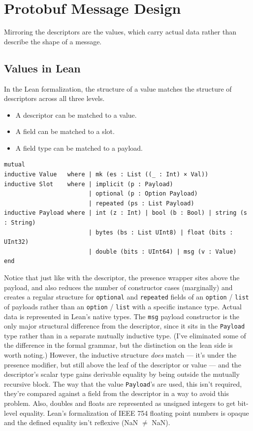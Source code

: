 \section{Protobuf Message Design}\label{sec:proto-msg}

Mirroring the descriptors are the values, which carry actual data rather than
describe the shape of a message.

\subsection{Values in Lean}

In the Lean formalization, the structure of a value matches the structure of
descriptors across all three levels.

\begin{itemize}
\item A descriptor can be matched to a value.
\item A field can be matched to a slot.
\item A field type can be matched to a payload.
\end{itemize}

\begin{verbatim}
mutual
inductive Value   where | mk (es : List ((_ : Int) × Val))
inductive Slot    where | implicit (p : Payload)
                        | optional (p : Option Payload)
                        | repeated (ps : List Payload)
inductive Payload where | int (z : Int) | bool (b : Bool) | string (s : String)
                        | bytes (bs : List UInt8) | float (bits : UInt32)
                        | double (bits : UInt64) | msg (v : Value)
end
\end{verbatim}

Notice that just like with the descriptor, the presence wrapper sites above the
payload, and also reduces the number of constructor cases (marginally) and
creates a regular structure for \texttt{optional} and \texttt{repeated} fields
of an \texttt{option} / \texttt{list} of payloads rather than an \texttt{option}
/ \texttt{list} with a specific instance type. Actual data is represented in
Lean's native types. The \texttt{msg} payload constructor is the only major
structural difference from the descriptor, since it sits in the \texttt{Payload}
type rather than in a separate mutually inductive type. (I've eliminated some of
the difference in the formal grammar, but the distinction on the lean side is
worth noting.) However, the inductive structure \emph{does} match --- it's
under the presence modifier, but still above the leaf of the descriptor or value
--- and the descriptor's scalar type gains derivable equality by being outside the
mutually recursive block. The way that the value \texttt{Payload}'s are used,
this isn't required, they're compared against a field from the descriptor in a
way to avoid this problem. Also, doubles and floats are represented as unsigned
integers to get bit-level equality. Lean's formalization of IEEE 754 floating
point numbers is opaque and the defined equality isn't reflexive (NaN $\ne$ NaN). 

